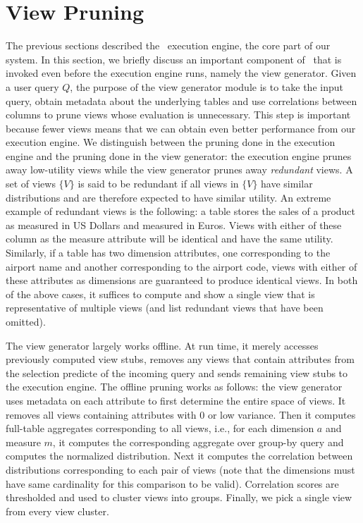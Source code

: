 
\section{View Pruning}
\label{sec:pruning}

The previous sections described the \VizRecDB\ execution engine, the core part
of our system.
In this section, we briefly discuss an important component of \VizRecDB\ that is invoked
even before the execution engine runs, namely the view generator.
Given a user query $Q$, the purpose of the view generator module is to take the
input query, obtain metadata about the underlying tables and use correlations
between columns to prune views whose evaluation is
unnecessary. 
This step is important because fewer views means that we can
obtain even better performance from our execution engine.
We distinguish between the pruning done in the execution engine and the pruning
done in the view generator: the execution engine prunes away low-utility views
while the view generator prunes away {\it redundant} views. 
A set of views $\{V\}$ is said to be redundant if all views in $\{V\}$ have
similar distributions and are therefore expected to have similar utility.
An extreme example of redundant views is the following: a table stores the sales
of a product as measured in US Dollars and measured in Euros. 
Views with either of these column as the measure attribute will be identical and
have the same utility.
Similarly, if a table has two dimension attributes, one corresponding to the
airport name and another corresponding to the airport code, views with either
of these attributes as dimensions are guaranteed to produce identical views.
In both of the above cases, it suffices to compute and show a single view
that is representative of multiple views (and list redundant
views that have been omitted).

The view generator largely works offline. At run time, it merely accesses
previously computed view stubs, removes any views that contain
attributes from the selection predicte of the incoming query and sends remaining
view stubs to the execution engine.
The offline pruning works as follows: the view generator uses metadata on each
attribute to first determine the entire space of views. 
It removes all views containing attributes with 0 or low variance.
Then it computes full-table aggregates corresponding to all views, i.e., for
each dimension $a$ and measure $m$, it computes the corresponding aggregate over
group-by query and computes the normalized distribution.
Next it computes the correlation between distributions corresponding to each
pair of views (note that the dimensions must have same cardinality for this
comparison to be valid).
Correlation scores are thresholded and used to cluster views into groups.
Finally, we pick a single view from every view cluster.

